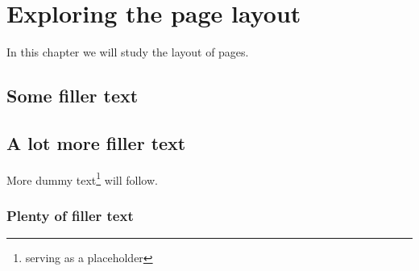 \documentclass[a4paper,12pt]{book}
\begin{document}
\chapter{Exploring the page layout}
In this chapter we will study the layout of pages.
\section{Some filler text}
\blindtext
\section{A lot more filler text}
More dummy text\footnote{serving as a placeholder} will follow.
\subsection{Plenty of filler text}
\blindtext[10]
\end{document}
